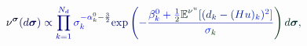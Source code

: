 \documentclass[12pt]{article}
\begin{document}
\makeatletter
\renewcommand*{\@textcolor}[3]{%
  \protect\leavevmode
  \begingroup
    \color#1{#2}#3%
  \endgroup
}
\makeatother
\begin{displaymath}
\mathcolor[RGB]{0,0,15}{\nu} ^ { \boldsymbol { \mathcolor[RGB]{0,0,30}{\sigma} } } \mathcolor[RGB]{0,0,45}{(} \mathcolor[RGB]{0,0,60}{d} \boldsymbol { \mathcolor[RGB]{0,0,75}{\sigma} } \mathcolor[RGB]{0,0,90}{)} \mathcolor[RGB]{0,0,105}{\propto} \mathcolor[RGB]{0,0,120}{\prod} _ { \mathcolor[RGB]{0,0,135}{k} \mathcolor[RGB]{0,0,150}{=} \mathcolor[RGB]{0,0,165}{1} } ^ { \mathcolor[RGB]{0,0,180}{N} _ { \mathcolor[RGB]{0,0,195}{d} } } \mathcolor[RGB]{0,0,210}{\sigma} _ { \mathcolor[RGB]{0,0,225}{k} } ^ { \mathcolor[RGB]{0,0,240}{-} \mathcolor[RGB]{0,0,255}{\alpha} _ { \mathcolor[RGB]{0,15,0}{k} } ^ { \mathcolor[RGB]{0,15,15}{0} } \mathcolor[RGB]{0,15,30}{-} \mathcolor[RGB]{0,15,45}{\frac { \mathcolor[RGB]{0,15,60}{3} } { \mathcolor[RGB]{0,15,75}{2} } } } \mathrm { \mathcolor[RGB]{0,15,90}{e} \mathcolor[RGB]{0,15,105}{x} \mathcolor[RGB]{0,15,120}{p} } \mathcolor[RGB]{0,15,135}{\left(} \mathcolor[RGB]{0,15,150}{-} \mathcolor[RGB]{0,15,165}{\frac { \mathcolor[RGB]{0,15,180}{\beta} _ { \mathcolor[RGB]{0,15,195}{k} } ^ { \mathcolor[RGB]{0,15,210}{0} } \mathcolor[RGB]{0,15,225}{+} \mathcolor[RGB]{0,15,240}{\frac { \mathcolor[RGB]{0,15,255}{1} } { \mathcolor[RGB]{0,30,0}{2} } } \mathbb { \mathcolor[RGB]{0,30,15}{E} } ^ { \mathcolor[RGB]{0,30,30}{\nu} ^ { \mathcolor[RGB]{0,30,45}{u} } } \mathcolor[RGB]{0,30,60}{[} \mathcolor[RGB]{0,30,75}{(} \mathcolor[RGB]{0,30,90}{d} _ { \mathcolor[RGB]{0,30,105}{k} } \mathcolor[RGB]{0,30,120}{-} \mathcolor[RGB]{0,30,135}{(} \mathcolor[RGB]{0,30,150}{H} \mathcolor[RGB]{0,30,165}{u} \mathcolor[RGB]{0,30,180}{)} _ { \mathcolor[RGB]{0,30,195}{k} } \mathcolor[RGB]{0,30,210}{)} ^ { \mathcolor[RGB]{0,30,225}{2} } \mathcolor[RGB]{0,30,240}{]} } { \mathcolor[RGB]{0,30,255}{\sigma} _ { \mathcolor[RGB]{0,45,0}{k} } } } \mathcolor[RGB]{0,45,15}{\right)} \mathcolor[RGB]{0,45,30}{d} \boldsymbol { \mathcolor[RGB]{0,45,45}{\sigma} } \mathcolor[RGB]{0,45,60}{,}
\end{displaymath}
\end{document}
